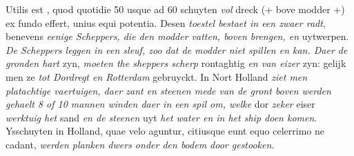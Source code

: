\pstart Utilis est , quod quotidie 50 usque ad 60 schuyten \textit{vol} dreck (+ bove modder +) ex fundo effert, unius equi potentia. Desen \textit{toestel bestaet in een zwaer radt}, benevens \textit{eenige Scheppers, die den modder vatten, boven brengen, en} uytwerpen. \textit{De Scheppers leggen in een sleuf, zoo dat de modder niet spillen en kan. Daer de gronden hart} zyn, \textit{moeten the sheppers scherp} rontaghtig \textit{en van eizer}\protect{} zyn: gelijk men ze \textit{tot Dordregt\protect{} en Rotterdam\protect{}} gebruyckt. In Nort Holland\protect{} \textit{ziet men platachtige vaertuigen, daer zant en steenen mede van de gront boven werden gehaelt 8 of 10 mannen winden daer in een spil\protect{} om, welke} dor \textit{zeker} eiser\protect{} \textit{werktuig het} sand \textit{en de steenen} uyt \textit{het water en in het ship\protect{} doen komen}. Ysschuyten\protect{} in Holland\protect{}, quae velo aguntur, citiusque eunt equo celerrimo ne cadant, \textit{werden planken dwers onder den bodem door gestooken}.
\pend 